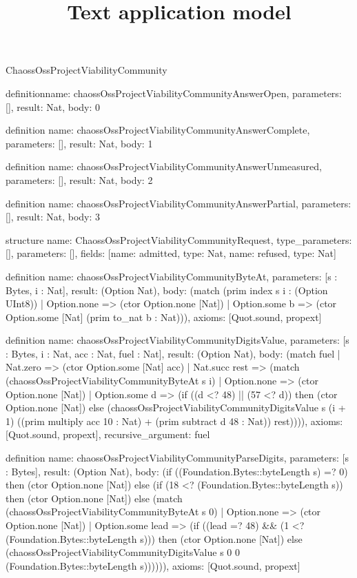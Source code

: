 \begin{lexlean}{ChaossOssProjectViabilityCommunity}
\title{Text application model}
\begin{semanticmodule}
definition{name: chaossOssProjectViabilityCommunityAnswerOpen, parameters: [], result: Nat, body: 0}

definition{
  name: chaossOssProjectViabilityCommunityAnswerComplete,
  parameters: [],
  result: Nat,
  body: 1
}

definition{
  name: chaossOssProjectViabilityCommunityAnswerUnmeasured,
  parameters: [],
  result: Nat,
  body: 2
}

definition{
  name: chaossOssProjectViabilityCommunityAnswerPartial,
  parameters: [],
  result: Nat,
  body: 3
}

structure{
  name: ChaossOssProjectViabilityCommunityRequest,
  type_parameters: [],
  parameters: [],
  fields: [{name: admitted, type: Nat}, {name: refused, type: Nat}]
}

definition{
  name: chaossOssProjectViabilityCommunityByteAt,
  parameters: [s : Bytes, i : Nat],
  result: (Option Nat),
  body: (match (prim index s i : (Option UInt8))
    | Option.none => (ctor Option.none [Nat])
    | Option.some b => (ctor Option.some [Nat] (prim to_nat b : Nat))),
  axioms: [Quot.sound, propext]
}

definition{
  name: chaossOssProjectViabilityCommunityDigitsValue,
  parameters: [s : Bytes, i : Nat, acc : Nat, fuel : Nat],
  result: (Option Nat),
  body: (match fuel
    | Nat.zero => (ctor Option.some [Nat] acc)
    | Nat.succ rest => (match (chaossOssProjectViabilityCommunityByteAt s i)
      | Option.none => (ctor Option.none [Nat])
      | Option.some d => (if ((d <? 48) || (57 <? d)) then (ctor Option.none [Nat]) else (chaossOssProjectViabilityCommunityDigitsValue s (i + 1) ((prim multiply acc 10 : Nat) + (prim subtract d 48 : Nat)) rest)))),
  axioms: [Quot.sound, propext],
  recursive_argument: fuel
}

definition{
  name: chaossOssProjectViabilityCommunityParseDigits,
  parameters: [s : Bytes],
  result: (Option Nat),
  body: (if ((Foundation.Bytes::byteLength s) =? 0) then (ctor Option.none [Nat]) else (if (18 <? (Foundation.Bytes::byteLength s)) then (ctor Option.none [Nat]) else (match (chaossOssProjectViabilityCommunityByteAt s 0)
    | Option.none => (ctor Option.none [Nat])
    | Option.some lead => (if ((lead =? 48) && (1 <? (Foundation.Bytes::byteLength s))) then (ctor Option.none [Nat]) else (chaossOssProjectViabilityCommunityDigitsValue s 0 0 (Foundation.Bytes::byteLength s)))))),
  axioms: [Quot.sound, propext]
}


\end{semanticmodule}
\end{lexlean}
